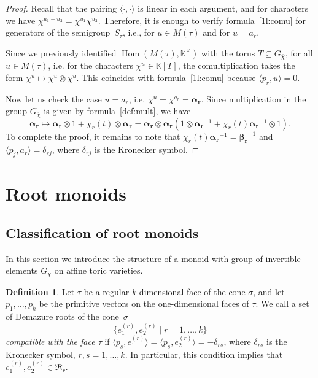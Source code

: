 \documentclass[a4paper, 11pt]{amsart}
\theoremstyle{plain}
\theoremstyle{remark}
\theoremstyle{definition}
\newtheorem{definition}[theorem]{Definition}
\newcommand{\KK}{\mathbb{K}}
\newcommand{\GG}{G_{\overline{\chi}}}
\newcommand{\Alp}[1]{\pmb{\alpha_{#1}}}
\newcommand{\Bet}[1]{\pmb{\beta_{#1}}}
\DeclareMathOperator{\Hom}{Hom}
\begin{document}
\begin{proof}
Recall that the pairing $\langle\cdot,\cdot\rangle$ is linear in each argument, and for characters we have $\chi^{u_1+u_2} = \chi^{u_1}\chi^{u_2}$. Therefore, it is enough to verify formula~\eqref{1l:comu} for generators of the semigroup~$S_\tau$, i.e., for $u \in M(\tau)$ and for $u = a_r$.

Since we previously identified $\Hom(M(\tau), \KK^\times)$ with the torus $T \subseteq \GG$, for all $u \in M(\tau)$, i.e. for the characters $\chi^u \in \KK[T]$, the comultiplication takes the form $\chi^u \mapsto \chi^u \otimes \chi^u$. This coincides with formula~\eqref{1l:comu} because $\langle p_r, u \rangle = 0$.

Now let us check the case $u = a_r$, i.e. $\chi^u = \chi^{a_r} = \Alp{r}$. Since multiplication in the group $\GG$ is given by formula~\eqref{def:mult}, we have
$$\Alp{r} \mapsto \Alp{r} \otimes 1  + \chi_r(t)\otimes \Alp{r} =\Alp{r} \otimes \Alp{r} (1 \otimes \Alp{r}^{-1}  + \chi_r(t) \Alp{r}^{-1}\otimes 1).$$
To complete the proof, it remains to note that $\chi_r(t)\Alp{r}^{-1} = \Bet{r}^{-1}$ and $\langle p_j, a_r \rangle = \delta_{rj}$, where $\delta_{rj}$ is the Kronecker symbol.
\end{proof}
		

\section{Root monoids}\label{sec:afftor}
\subsection{Classification of root monoids}
In this section we introduce the structure of a monoid with group of invertible elements $\GG$ on affine toric varieties.

\begin{definition}
Let $\tau$ be a regular $k$-dimensional face of the cone $\sigma$, and let $p_1, \ldots, p_k$ be the primitive vectors on the one-dimensional faces of $\tau$. We call a set of Demazure roots of the cone~$\sigma$ $$\{e_1^{(r)}, e_2^{(r)} \mid r = 1,\ldots,k\}$$ \textit{compatible with the face $\tau$} if $\langle p_s, e_1^{(r)} \rangle = \langle p_s, e_2^{(r)} \rangle = -\delta_{rs}$, where $\delta_{rs}$ is the Kronecker symbol, $r, s = 1, \ldots, k$.
In particular, this condition implies that ${e_1^{(r)}, e_2^{(r)} \in \mathfrak{R}_r}$.
\end{definition}
\end{document}
